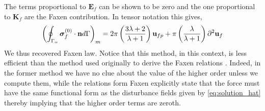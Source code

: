 The terms proportional to $\textbf{E}_f$ can be shown to be zero and the one proportional to $\textbf{K}_f$ are the Faxen contribution. 
In tensor notation this gives, 
\begin{align*}
    \left(
        \oint_{\Gamma_{\alpha}} \bm\sigma_f^{(0)} \cdot \textbf{n} d\Gamma
    \right)_m
    = 
     2\pi\left(\frac{3\lambda +2 }{\lambda +1}\right)
    \textbf{u}_{fp}  
    + \pi \left(\frac{\lambda }{\lambda +1}\right)\partial^2 \textbf{u}_f
\end{align*}
We thus recovered Faxen law. 
Notice that this method, in this context, is less efficient than the method used originally to derive the Faxen relations \citet{kim2013microhydrodynamics}. 
Indeed, in the former method we have no clue about the value of the higher order unless we compute them, while the relations form Faxen explicitly state that the force must have the same functional form as the disturbance fields given by \ref{eq:solution_hat} thereby implying that the higher order terms are zeroth. 


